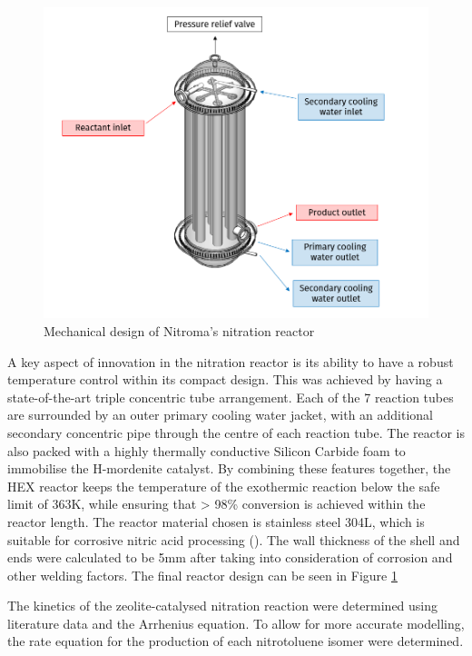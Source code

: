 \begin{figure}
    \centering
    \includegraphics[width=\linewidth]{chapters/0-executive-summary/figures/FYD executive sum.PNG}
    \caption{Mechanical design of Nitroma's nitration reactor}
    \label{fig:executivesummaryreactor}
\end{figure}
A key aspect of innovation in the nitration reactor is its ability to have a robust temperature control within its compact design. This was achieved by having a state-of-the-art triple concentric tube arrangement. Each of the 7 reaction tubes are surrounded by an outer primary cooling water jacket, with an additional secondary concentric pipe through the centre of each reaction tube. The reactor is also packed with a highly thermally conductive Silicon Carbide foam to immobilise the H-mordenite catalyst. By combining these features together, the HEX reactor keeps the temperature of the exothermic reaction below the safe limit of 363K, while ensuring that > 98\% conversion is achieved within the reactor length.
The reactor material chosen is stainless steel 304L, which is suitable for corrosive nitric acid processing (). The wall thickness of the shell and ends were calculated to be 5mm after taking into consideration of corrosion and other welding factors. The final reactor design can be seen in Figure \ref{fig:executivesummaryreactor}

The kinetics of the zeolite-catalysed nitration reaction were determined using literature data and the Arrhenius equation. To allow for more accurate modelling, the rate equation for the production of each nitrotoluene isomer were determined. 

